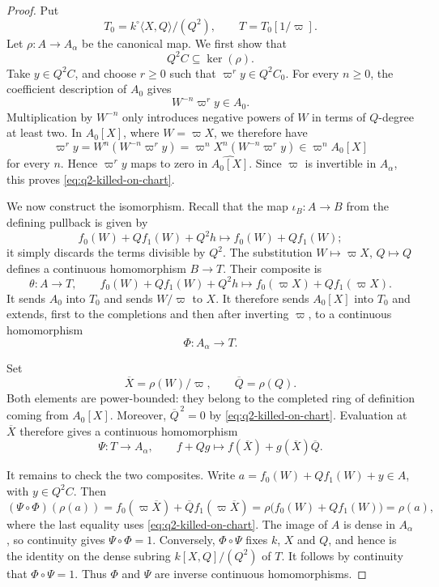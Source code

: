 \documentclass[11pt,reqno]{amsart}
\theoremstyle{definition}
\begin{document}
\begin{proof}
Put
\[
  T_0=k^\circ\langle X,Q\rangle/(Q^2),
  \qquad T=T_0[1/\varpi].
\]
Let $\rho:A\to A_\alpha$ be the canonical map.  We first show that
\begin{equation}\label{eq:q2-killed-on-chart}
  Q^2C\subseteq\ker(\rho).
\end{equation}
Take $y\in Q^2C$, and choose $r\geq0$ such that
$\varpi^r y\in Q^2C_0$.  For every $n\geq0$, the coefficient description of
$A_0$ gives
\[
  W^{-n}\varpi^r y\in A_0.
\]
Multiplication by $W^{-n}$ only introduces negative powers of $W$ in terms
of $Q$-degree at least two.  In $A_0[X]$, where $W=\varpi X$, we therefore
have
\[
  \varpi^r y
   =W^n(W^{-n}\varpi^r y)
   =\varpi^nX^n(W^{-n}\varpi^r y)\in\varpi^nA_0[X]
\]
for every $n$.  Hence $\varpi^r y$ maps to zero in
$\widehat{A_0[X]}$.  Since $\varpi$ is invertible in
$A_\alpha$, this proves \eqref{eq:q2-killed-on-chart}.

We now construct the isomorphism.  Recall that the map
$\iota_B:A\to B$ from the defining pullback is given by
\[
  f_0(W)+Qf_1(W)+Q^2h\longmapsto f_0(W)+Qf_1(W);
\]
it simply discards the terms divisible by $Q^2$.  The substitution
$W\mapsto\varpi X$, $Q\mapsto Q$ defines a continuous homomorphism
$B\to T$.  Their composite is
\[
  \theta:A\longrightarrow T,\qquad
  f_0(W)+Qf_1(W)+Q^2h\longmapsto
  f_0(\varpi X)+Qf_1(\varpi X).
\]
It sends $A_0$ into $T_0$ and sends $W/\varpi$ to $X$.  It therefore sends
$A_0[X]$ into $T_0$ and extends, first to the completions and then
after inverting $\varpi$, to a continuous homomorphism
\[
  \Phi:A_\alpha\longrightarrow T.
\]

Set
\[
  \overline X=\rho(W)/\varpi,\qquad \overline Q=\rho(Q).
\]
Both elements are power-bounded: they belong to the completed ring of
definition coming from $A_0[X]$.  Moreover,
\(\overline Q^{\,2}=0\) by \eqref{eq:q2-killed-on-chart}.  Evaluation at
$\overline X$ therefore gives a continuous homomorphism
\[
  \Psi:T\longrightarrow A_\alpha,\qquad
  f+Qg\longmapsto f(\overline X)+g(\overline X)\overline Q.
\]

It remains to check the two composites.  Write
$a=f_0(W)+Qf_1(W)+y\in A$, with $y\in Q^2C$.  Then
\[
  (\Psi \circ \Phi)(\rho(a))
  =f_0(\varpi\overline X)+\overline Qf_1(\varpi\overline X)
  =\rho\bigl(f_0(W)+Qf_1(W)\bigr)
  =\rho(a),
\]
where the last equality uses \eqref{eq:q2-killed-on-chart}.  The
image of $A$ is dense in $A_\alpha$, so continuity gives
$\Psi \circ \Phi=1$.  Conversely, $\Phi \circ \Psi$ fixes $k$, $X$ and $Q$, and hence is
the identity on the dense subring $k[X,Q]/(Q^2)$ of $T$.  It follows by
continuity that $\Phi\circ \Psi=1$.  Thus $\Phi$ and $\Psi$ are inverse continuous
homomorphisms.
\end{proof}
\end{document}
